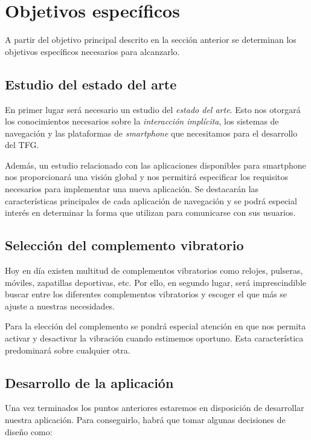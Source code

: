 \section{Objetivos específicos}

A partir del objetivo principal descrito en la sección anterior se determinan los objetivos
específicos necesarios para alcanzarlo.

\subsection{Estudio del estado del arte}

En primer lugar será necesario un estudio del \emph{estado del arte}. Esto nos otorgará los
conocimientos necesarios sobre la \emph{interacción implícita}, los sistemas de navegación y
las plataformas de \emph{smartphone} que necesitamos para el desarrollo del \acs{TFG}.

Además, un estudio relacionado con las aplicaciones disponibles para smartphone nos
proporcionará una visión global y nos permitirá especificar los requisitos necesarios para
implementar una nueva aplicación. Se destacarán las características principales de cada aplicación
de navegación y se podrá especial interés en determinar la forma que utilizan para comunicarse con
sus usuarios.

\subsection{Selección del complemento vibratorio}

Hoy en día existen multitud de complementos vibratorios como relojes, pulseras, móviles, zapatillas
deportivas, etc. Por ello, en segundo lugar, será imprescindible buscar entre los diferentes
complementos vibratorios y escoger el que más se ajuste a nuestras necesidades.

Para la elección del complemento se pondrá especial atención en que nos permita activar y desactivar
la vibración cuando estimemos oportuno. Esta característica predominará sobre cualquier otra.

\subsection{Desarrollo de la aplicación}

Una vez terminados los puntos anteriores estaremos en disposición de desarrollar nuestra aplicación.
Para conseguirlo, habrá que tomar algunas decisiones de diseño como:

